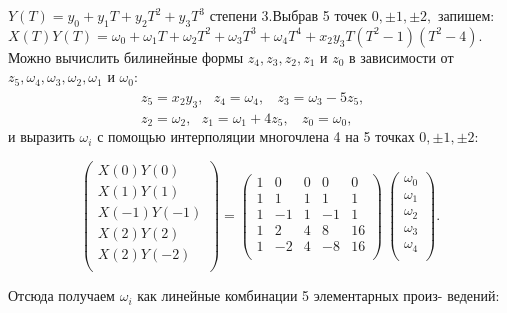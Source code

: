 \documentclass{mai_book}
\begin{document}
\newpage
\noindent $Y(T)=y_0+y_1T+y_2T^2+y_3T^3$ степени 3.Выбрав 5 точек $0,\pm 1,\pm 2,$\linebreak
запишем: \\

$X(T)Y(T)=\omega_0+\omega_1T+\omega_2T^2+\omega_3T^3+\omega_4T^4+x_2y_3T(T^2-1)(T^2-4).$ \\

\noindent Можно вычислить билинейные формы $z_4,z_3,z_2,z_1$ и $z_0$ в зависимости\linebreak
от $z_5,\omega_4,\omega_3,\omega_2,\omega_1$ и $\omega_0$: \\

\indent ~~~~~~~~~~~~~~~~~~~$z_5=x_2y_3,~~~z_4=\omega_4,~~~~z_3=\omega_3-5z_5, $\\
\indent ~~~~~~~~~~~~~~~~~~~$z_2 =\omega_2,~~~z_1=\omega_1+4z_5,~~~~z_0=\omega_0, $\\

\noindent и выразить $\omega_i$ с помощью интерполяции многочлена 4 на 5\linebreak
точках $0,\pm 1 ,\pm 2:$  

$$
\left(\begin{array}{c}
 X(0)Y(0) \\
 X(1)Y(1) \\
X(-1)Y(-1) \\
X(2)Y(2) \\
X(2)Y(-2) \\
\end{array}\right)= 
\left(\begin{array}{ccccc}
1 & 0 & 0 & 0 & 0  \\
1 & 1 & 1 & 1 & 1  \\
1 & -1 & 1 & -1 & 1  \\
1 & 2 & 4 & 8 & 16 \\
1 & -2 & 4 & -8 & 16  \\
\end{array}\right)~
\left(\begin{array}{c}
\omega_0 \\
 \omega_1 \\
\omega_2 \\
\omega_3 \\
\omega_4 \\
\end{array}\right).
$$

\noindent Отсюда получаем $\omega_i$ как линейные комбинации 5 элементарных произ-\linebreak
ведений: \\
\end{document}
